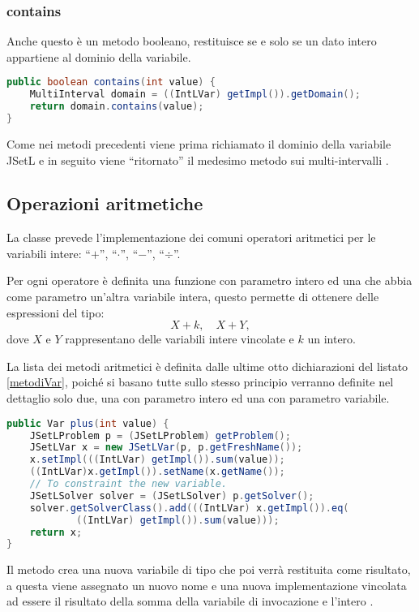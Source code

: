 \subsubsection{contains}
Anche questo è un metodo booleano, restituisce  se e solo se
un dato intero appartiene al dominio della variabile.
\begin{lstlisting}[language = Java,
                   caption = {\files{isBound}.}]
public boolean contains(int value) {
	MultiInterval domain = ((IntLVar) getImpl()).getDomain();
	return domain.contains(value);
}
\end{lstlisting}
Come nei metodi precedenti viene prima richiamato il dominio della variabile
JSetL e in seguito viene ``ritornato'' il medesimo metodo sui multi-intervalli
.

\subsection{Operazioni aritmetiche}
La classe  prevede l'implementazione dei comuni operatori
aritmetici per le variabili intere: ``$+$'', ``$\cdot$'', ``$-$'', ``$\div$''.

Per ogni operatore è definita una funzione con parametro intero ed una che abbia
come parametro un'altra variabile intera, questo permette di ottenere delle
espressioni del tipo:
\[
X + k, \quad X + Y,
\]
dove $X$ e $Y$ rappresentano delle variabili intere vincolate e $k$ un intero.

La lista dei metodi aritmetici è definita dalle ultime otto dichiarazioni
del listato \ref{metodiVar}, poiché si basano tutte sullo stesso principio
verranno definite nel dettaglio solo due, una con parametro intero ed
una con parametro variabile.

\begin{lstlisting}[language = Java,
                   caption = {\files{plus}, con parametro intero.}]
public Var plus(int value) {
	JSetLProblem p = (JSetLProblem) getProblem();
	JSetLVar x = new JSetLVar(p, p.getFreshName());
	x.setImpl(((IntLVar) getImpl()).sum(value));
	((IntLVar)x.getImpl()).setName(x.getName());
	// To constraint the new variable.
	JSetLSolver solver = (JSetLSolver) p.getSolver();
	solver.getSolverClass().add(((IntLVar) x.getImpl()).eq(
			((IntLVar) getImpl()).sum(value)));
	return x;
}
\end{lstlisting}
Il metodo crea una nuova variabile  di tipo  che
poi verrà restituita come risultato, a questa viene assegnato un nuovo nome
e una nuova implementazione vincolata ad essere il risultato della somma
della variabile di invocazione e l'intero .

